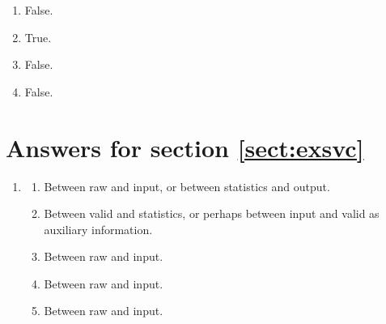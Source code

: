\begin{enumerate}
\begin{enumerate}
  \item False. %
  \item True. %
  \item False. %
  \item False. %
  \end{enumerate}
\end{enumerate}


\section*{Answers for section \ref{sect:exsvc}}
\label{sect:anssvc}
\begin{enumerate}
\item
  \begin{enumerate}
  \item Between raw and input, or between statistics and output.
  \item Between valid and statistics, or perhaps between input and valid as auxiliary information.
  \item Between raw and input.
  \item Between raw and input.
  \item Between raw and input.
  \end{enumerate}
\end{enumerate}


